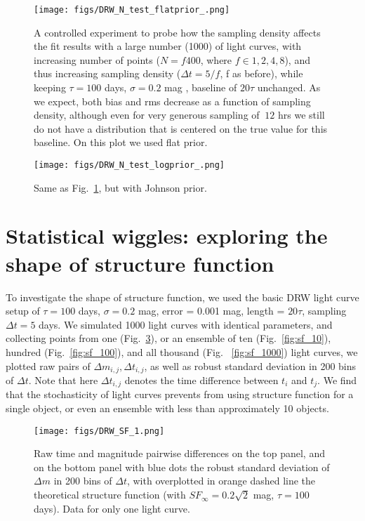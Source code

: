 \documentclass[fleqn,usenatbib]{mnras}  %
\begin{document}

\begin{figure}
\texttt{[image: figs/DRW\_N\_test\_flatprior\_.png]}
\caption{A controlled experiment to probe how the sampling density affects the fit results with a large number (1000) of light curves, with increasing number of points ($N = f 400$, where $f \in {1,2,4,8}$), and thus increasing sampling density ($\Delta t = 5 /f $, f as before), while keeping  $\tau=100$ days, $\sigma=0.2$ mag  , baseline of $20 \tau$ unchanged. As we expect, both bias and rms decrease as a function of sampling density, although even for very generous sampling of $~12$ hrs we still do not have a distribution that is centered on the true value for this baseline. On this plot we used flat prior. }
\label{fig:sim_lc_N_pts_flat}
\end{figure}


\begin{figure}
\texttt{[image: figs/DRW\_N\_test\_logprior\_.png]}
\caption{Same as Fig.~\ref{fig:sim_lc_N_pts_flat}, but with Johnson prior.}
\label{fig:sim_lc_N_pts_log}
\end{figure}

\section{Statistical wiggles:  exploring the shape of structure function}
To investigate the shape of structure function, we used the basic DRW light curve setup of $\tau=100$ days,  $\sigma=0.2$ mag, error = 0.001 mag, length = $20 \tau$, sampling $\Delta t = 5 $ days. We simulated 1000 light curves with identical parameters, and collecting points from  one (Fig.~\ref{fig:sf_1}), or an ensemble of  ten (Fig.~\ref{fig:sf_10}), hundred (Fig.~\ref{fig:sf_100}), and all thousand  (Fig. ~\ref{fig:sf_1000}) light curves, we plotted raw pairs of  $\Delta m_{i,j}, \Delta t_{i,j}$, as well as robust standard deviation in 200 bins of $\Delta t$.  Note that here $\Delta t_{i,j}$ denotes the time difference between $t_{i}$ and $t_{j}$. We find that the stochasticity of light curves prevents from using structure function for a single object, or even an ensemble with less than approximately 10 objects. 

\begin{figure}
\texttt{[image: figs/DRW\_SF\_1.png]}
\caption{Raw time and magnitude pairwise differences on the top panel, and on the bottom panel with blue dots the robust standard deviation of $\Delta m$ in 200 bins of $\Delta t$, with overplotted in orange dashed line the theoretical structure function (with $SF_{\infty}=0.2 \sqrt{2} $ mag, $\tau=100$ days). Data for only one light curve. }
\label{fig:sf_1}
\end{figure}
\end{document}
